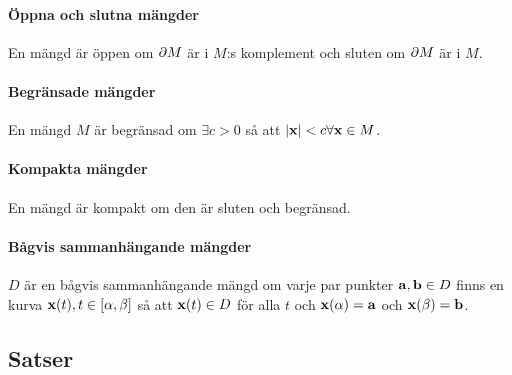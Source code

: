 \paragraph{Öppna och slutna mängder}
En mängd är öppen om $\partial M$ är i $M$:s komplement och sluten om $\partial M$ är i $M$.

\paragraph{Begränsade mängder}
En mängd $M$ är begränsad om $\exists c > 0$ så att $\abs{\vect{x}} < c\forall \vect{x}\in M$.

\paragraph{Kompakta mängder}
En mängd är kompakt om den är sluten och begränsad.

\paragraph{Bågvis sammanhängande mängder}
$D$ är en bågvis sammanhängande mängd om varje par punkter $\vect{a}, \vect{b}\in D$ finns en kurva $\vect{x}(t), t\in [\alpha, \beta]$ så att $\vect{x}(t)\in D$ för alla $t$ och $\vect{x}(\alpha) = \vect{a}$ och $\vect{x}(\beta) = \vect{b}$.

\subsection{Satser}